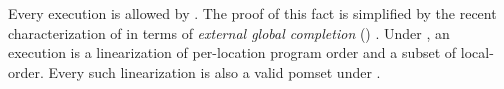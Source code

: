 Every \armeight{} execution is allowed by .  The
proof of this fact is simplified by the recent characterization of
\armeight{} in terms of \emph{external global completion} (\EGC{})
\cite[\textsection B2.3.6]{arm-reference-manual}.  Under \EGC{}, an
\armeight{} execution is a linearization of per-location program order and a
subset of local-order.  Every such linearization is also a valid pomset under
.





